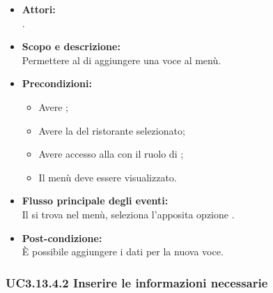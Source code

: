 \begin{itemize}
	\item \textbf{Attori:}
	\\.
	\item \textbf{Scopo e descrizione:} 
	\\Permettere al  di aggiungere una voce al menù.
	\item \textbf{Precondizioni:}
	\begin{itemize}
		\item Avere ;
		\item Avere la  del ristorante selezionato;
		\item Avere accesso alla  con il ruolo di ;
		\item Il menù deve essere visualizzato.
	\end{itemize}
	\item \textbf{Flusso principale degli eventi:}
	\\Il {} si trova nel menù, seleziona l'apposita opzione .
	\item \textbf{Post-condizione:}
	\\È possibile aggiungere i dati per la nuova voce.
\end{itemize}

\subsubsection{UC3.13.4.2 Inserire le informazioni necessarie} \label{UC3.13.4.2}

